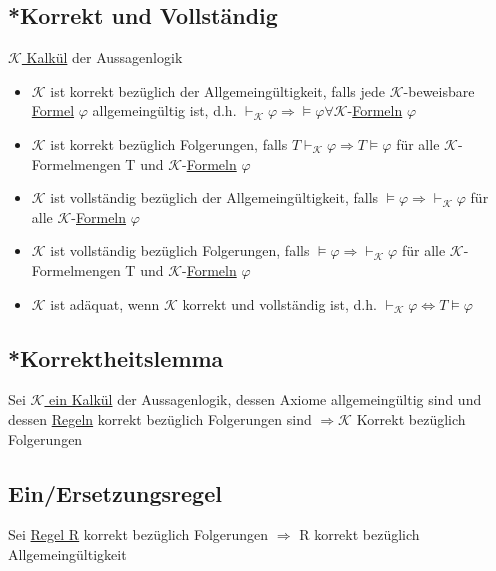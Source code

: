 \documentclass[12pt,a4paper]{article} %
\begin{document}
	\subsection{*Korrekt und Vollständig}
	\label{ALVollstandig}
	\hyperref[Kalkul]{$\mathcal{K}$ Kalkül} der Aussagenlogik
	\begin{itemize}
		\item $\mathcal{K}$ ist korrekt bezüglich der Allgemeingültigkeit, falls jede $\mathcal{K}$-beweisbare \hyperref[Formel]{Formel} $\varphi$ allgemeingültig ist, d.h. $\hyperref[Beweisbar]{\vdash_{\mathcal{K}}} \varphi \Rightarrow \hyperref[Erfullbar]{\vDash} \varphi \forall \mathcal{K}$-\hyperref[Formel]{Formeln} $\varphi$ 
		\item $\mathcal{K}$ ist korrekt bezüglich Folgerungen, falls $T \hyperref[Beweisbar]{\vdash_{\mathcal{K}}} \varphi \Rightarrow T \hyperref[Erfullbar]{\vDash} \varphi$ für alle $\mathcal{K}$-Formelmengen T und $\mathcal{K}$-\hyperref[Formel]{Formeln} $\varphi$
		\item $\mathcal{K}$ ist vollständig bezüglich der Allgemeingültigkeit, falls $\hyperref[Erfullbar]{\vDash} \varphi \Rightarrow \hyperref[Beweisbar]{\vdash_{\mathcal{K}}} \varphi$ für alle $\mathcal{K}$-\hyperref[Formel]{Formeln} $\varphi$
		\item $\mathcal{K}$ ist vollständig bezüglich Folgerungen, falls $\hyperref[Erfullbar]{\vDash} \varphi \Rightarrow \hyperref[Beweisbar]{\vdash_{\mathcal{K}}} \varphi$ für alle $\mathcal{K}$-Formelmengen T und $\mathcal{K}$-\hyperref[Formel]{Formeln} $\varphi$
		\item $\mathcal{K}$ ist adäquat, wenn $\mathcal{K}$ korrekt und vollständig ist, d.h. $\hyperref[Beweisbar]{\vdash_{\mathcal{K}}} \varphi \Leftrightarrow T \hyperref[Erfullbar]{\vDash} \varphi$
	\end{itemize}

	\subsection{*Korrektheitslemma}
	Sei \hyperref[Kalkul]{$\mathcal{K}$ ein Kalkül} der Aussagenlogik, dessen Axiome allgemeingültig sind und dessen \hyperref[Kalkul]{Regeln} korrekt bezüglich Folgerungen sind $\Rightarrow \mathcal{K}$ Korrekt bezüglich Folgerungen
	
	\subsection{Ein/Ersetzungsregel}
	Sei \hyperref[Kalkul]{Regel R} korrekt bezüglich Folgerungen $\Rightarrow$ R korrekt bezüglich Allgemeingültigkeit
	
\end{document}
